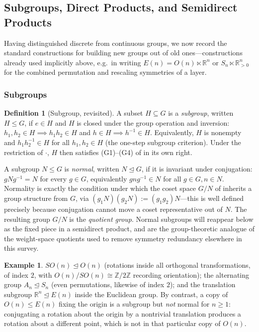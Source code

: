 \documentclass[11pt]{article}
\theoremstyle{plain}
\theoremstyle{definition}
\newtheorem{Definition}{Definition}[section]
\newtheorem{Example}{Example}[section]
\begin{document}

\subsection{Subgroups, Direct Products, and Semidirect Products}
\label{subsec:subgroups-products}

Having distinguished discrete from continuous groups, we now record the
standard constructions for building new groups out of old ones---constructions
already used implicitly above, e.g.\ in writing $E(n) = O(n) \ltimes
\mathbb{R}^n$ or $S_n \ltimes \mathbb{R}_{>0}^n$ for the combined permutation
and rescaling symmetries of a layer.

\subsubsection{Subgroups}
\label{subsubsec:subgroups}

\begin{Definition}[Subgroup, revisited]
\label{def:subgroup}
A subset $H \subseteq G$ is a \emph{subgroup}, written $H \leq G$, if
$e \in H$ and $H$ is closed under the group operation and inversion:
$h_1, h_2 \in H \implies h_1 h_2 \in H$ and $h \in H \implies h^{-1} \in H$.
Equivalently, $H$ is nonempty and $h_1 h_2^{-1} \in H$ for all
$h_1, h_2 \in H$ (the one-step subgroup criterion). Under the restriction of
$\cdot$, $H$ then satisfies (G1)--(G4) of  in its
own right.
\end{Definition}

A subgroup $N \leq G$ is \emph{normal}, written $N \trianglelefteq G$, if it
is invariant under conjugation: $g N g^{-1} = N$ for every $g \in G$,
equivalently $g n g^{-1} \in N$ for all $g \in G, n \in N$. Normality is
exactly the condition under which the coset space $G/N$ of
 inherits a group structure from $G$, via
$(g_1 N)(g_2 N) := (g_1 g_2) N$---this is well defined precisely because
conjugation cannot move a coset representative out of $N$. The resulting
group $G/N$ is the \emph{quotient group}. Normal subgroups will reappear
below as the fixed piece in a semidirect product, and are the group-theoretic
analogue of the weight-space quotients used to remove symmetry redundancy
elsewhere in this survey.

\begin{Example}
\label{ex:subgroups}
$SO(n) \trianglelefteq O(n)$ (rotations inside all orthogonal
transformations, of index $2$, with $O(n)/SO(n) \cong \mathbb{Z}/2\mathbb{Z}$
recording orientation); the alternating group
$A_n \trianglelefteq S_n$ (even permutations, likewise of index $2$); and the
translation subgroup $\mathbb{R}^n \trianglelefteq E(n)$ inside the Euclidean
group. By contrast, a copy of $O(n) \leq E(n)$ fixing the origin is a
subgroup but \emph{not} normal for $n \geq 1$: conjugating a rotation about
the origin by a nontrivial translation produces a rotation about a different
point, which is not in that particular copy of $O(n)$.
\end{Example}
\end{document}
